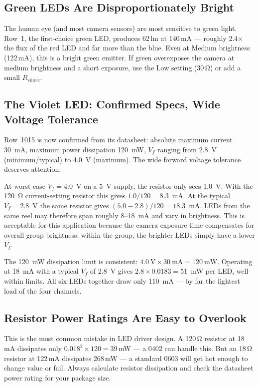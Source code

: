 \documentclass[12pt,letterpaper]{article}
\begin{document}
\subsection{Green LEDs Are Disproportionately Bright}

The human eye (and most camera sensors) are most sensitive to green light. Row~1,
the first-choice green LED, produces 62\,lm at 140\,mA --- roughly 2.4$\times$ the flux
of the red LED and far more than the blue. Even at Medium brightness (122\,mA),
this is a bright green emitter. If green overexposes the camera at medium brightness
and a short exposure, use the Low setting (30\,\si{\ohm}) or add a small $R_{share}$.

\subsection{The Violet LED: Confirmed Specs, Wide Voltage Tolerance}

Row~1015 is now confirmed from its datasheet: absolute maximum current 30~mA,
maximum power dissipation 120~mW, $V_f$ ranging from 2.8~V (minimum/typical) to
4.0~V (maximum). The wide forward voltage tolerance deserves attention.

At worst-case $V_f = 4.0$~V on a 5~V supply, the resistor only sees 1.0~V.
With the 120~\si{\ohm} current-setting resistor this gives $1.0/120 = 8.3$~mA.
At the typical $V_f = 2.8$~V the same resistor gives $(5.0-2.8)/120 = 18.3$~mA.
LEDs from the same reel may therefore span roughly 8--18~mA and vary in brightness.
This is acceptable for this application because the camera exposure time compensates
for overall group brightness; within the group, the brighter LEDs simply have a lower $V_f$.

The 120~mW dissipation limit is consistent: $4.0~\text{V} \times 30~\text{mA} = 120~\text{mW}$.
Operating at 18~mA with a typical $V_f$ of 2.8~V gives $2.8 \times 0.0183 = 51$~mW per LED,
well within limits. All six LEDs together draw only 110~mA --- by far the lightest load
of the four channels.

\subsection{Resistor Power Ratings Are Easy to Overlook}

This is the most common mistake in LED driver design. A 120\,\si{\ohm} resistor at
18\,mA dissipates only $0.018^2 \times 120 = 39$\,mW --- a 0402 can handle this.
But an 18\,\si{\ohm} resistor at 122\,mA dissipates 268\,mW --- a standard 0603
will get hot enough to change value or fail. Always calculate resistor dissipation
and check the datasheet power rating for your package size.
\end{document}
